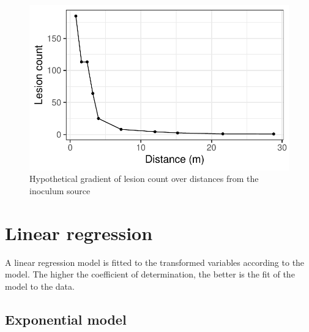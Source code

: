 \documentclass[
  letterpaper,
  DIV=11,
  numbers=noendperiod]{scrreprt}
\newenvironment{Shaded}{\begin{snugshade}}{\end{snugshade}}
\newcommand{\AttributeTok}[1]{\textcolor[rgb]{0.40,0.45,0.13}{#1}}
\newcommand{\FunctionTok}[1]{\textcolor[rgb]{0.28,0.35,0.67}{#1}}
\newcommand{\NormalTok}[1]{\textcolor[rgb]{0.00,0.23,0.31}{#1}}
\newcommand{\OtherTok}[1]{\textcolor[rgb]{0.00,0.23,0.31}{#1}}
\newcommand{\SpecialCharTok}[1]{\textcolor[rgb]{0.37,0.37,0.37}{#1}}
\begin{document}
\begin{figure}[H]

{\centering \includegraphics{spatial-fitting_files/figure-pdf/fig-fit_grad1-1.pdf}

}

\caption{\label{fig-fit_grad1}Hypothetical gradient of lesion count over
distances from the inoculum source}

\end{figure}

\hypertarget{linear-regression-1}{%
\section{Linear regression}\label{linear-regression-1}}

A linear regression model is fitted to the transformed variables
according to the model. The higher the coefficient of determination, the
better is the fit of the model to the data.

\hypertarget{exponential-model-1}{%
\subsection{Exponential model}\label{exponential-model-1}}

\begin{Shaded}
\end{Shaded}
\end{document}
